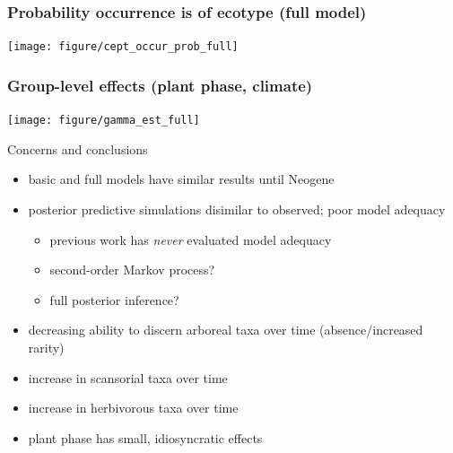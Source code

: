 \documentclass{beamer}
\begin{document}
\begin{frame}
  \frametitle{Probability occurrence is of ecotype (full model)}

  \begin{center}
    \texttt{[image: figure/cept\_occur\_prob\_full]}
  \end{center}
\end{frame}


\begin{frame}
  \frametitle{Group-level effects (plant phase, climate)}

  \begin{center}
    \texttt{[image: figure/gamma\_est\_full]}
  \end{center}
\end{frame}


\begin{frame}
  \begin{block}{Concerns and conclusions}
    \begin{itemize}
      \item basic and full models have similar results until Neogene
      \item posterior predictive simulations disimilar to observed; poor model adequacy
        \begin{itemize}
          \item previous work has \emph{never} evaluated model adequacy
          \item second-order Markov process?
          \item full posterior inference?
        \end{itemize}
      \item decreasing ability to discern arboreal taxa over time (absence/increased rarity)
      \item increase in scansorial taxa over time
      \item increase in herbivorous taxa over time
      \item plant phase has small, idiosyncratic effects
    \end{itemize}
  \end{block}
\end{frame}
\end{document}
